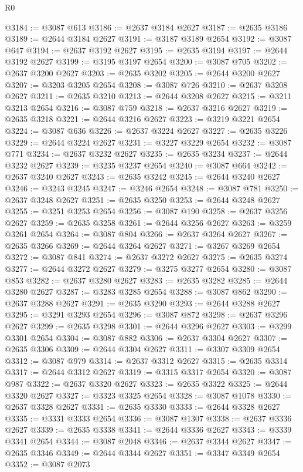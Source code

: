 \begin{lexlean}{R0}
\begin{coremodule}
@3184 := @3087 @613
@3186 := @2637 @3184 @2627
@3187 := @2635 @3186
@3189 := @2644 @3184 @2627
@3191 := @3187 @3189 @2654
@3192 := @3087 @647
@3194 := @2637 @3192 @2627
@3195 := @2635 @3194
@3197 := @2644 @3192 @2627
@3199 := @3195 @3197 @2654
@3200 := @3087 @705
@3202 := @2637 @3200 @2627
@3203 := @2635 @3202
@3205 := @2644 @3200 @2627
@3207 := @3203 @3205 @2654
@3208 := @3087 @726
@3210 := @2637 @3208 @2627
@3211 := @2635 @3210
@3213 := @2644 @3208 @2627
@3215 := @3211 @3213 @2654
@3216 := @3087 @759
@3218 := @2637 @3216 @2627
@3219 := @2635 @3218
@3221 := @2644 @3216 @2627
@3223 := @3219 @3221 @2654
@3224 := @3087 @636
@3226 := @2637 @3224 @2627
@3227 := @2635 @3226
@3229 := @2644 @3224 @2627
@3231 := @3227 @3229 @2654
@3232 := @3087 @771
@3234 := @2637 @3232 @2627
@3235 := @2635 @3234
@3237 := @2644 @3232 @2627
@3239 := @3235 @3237 @2654
@3240 := @3087 @664
@3242 := @2637 @3240 @2627
@3243 := @2635 @3242
@3245 := @2644 @3240 @2627
@3246 := @3243 @3245
@3247 := @3246 @2654
@3248 := @3087 @781
@3250 := @2637 @3248 @2627
@3251 := @2635 @3250
@3253 := @2644 @3248 @2627
@3255 := @3251 @3253 @2654
@3256 := @3087 @190
@3258 := @2637 @3256 @2627
@3259 := @2635 @3258
@3261 := @2644 @3256 @2627
@3263 := @3259 @3261 @2654
@3264 := @3087 @804
@3266 := @2637 @3264 @2627
@3267 := @2635 @3266
@3269 := @2644 @3264 @2627
@3271 := @3267 @3269 @2654
@3272 := @3087 @841
@3274 := @2637 @3272 @2627
@3275 := @2635 @3274
@3277 := @2644 @3272 @2627
@3279 := @3275 @3277 @2654
@3280 := @3087 @853
@3282 := @2637 @3280 @2627
@3283 := @2635 @3282
@3285 := @2644 @3280 @2627
@3287 := @3283 @3285 @2654
@3288 := @3087 @862
@3290 := @2637 @3288 @2627
@3291 := @2635 @3290
@3293 := @2644 @3288 @2627
@3295 := @3291 @3293 @2654
@3296 := @3087 @872
@3298 := @2637 @3296 @2627
@3299 := @2635 @3298
@3301 := @2644 @3296 @2627
@3303 := @3299 @3301 @2654
@3304 := @3087 @882
@3306 := @2637 @3304 @2627
@3307 := @2635 @3306
@3309 := @2644 @3304 @2627
@3311 := @3307 @3309 @2654
@3312 := @3087 @979
@3314 := @2637 @3312 @2627
@3315 := @2635 @3314
@3317 := @2644 @3312 @2627
@3319 := @3315 @3317 @2654
@3320 := @3087 @987
@3322 := @2637 @3320 @2627
@3323 := @2635 @3322
@3325 := @2644 @3320 @2627
@3327 := @3323 @3325 @2654
@3328 := @3087 @1078
@3330 := @2637 @3328 @2627
@3331 := @2635 @3330
@3333 := @2644 @3328 @2627
@3335 := @3331 @3333 @2654
@3336 := @3087 @1307
@3338 := @2637 @3336 @2627
@3339 := @2635 @3338
@3341 := @2644 @3336 @2627
@3343 := @3339 @3341 @2654
@3344 := @3087 @2048
@3346 := @2637 @3344 @2627
@3347 := @2635 @3346
@3349 := @2644 @3344 @2627
@3351 := @3347 @3349 @2654
@3352 := @3087 @2073

\end{coremodule}
\end{lexlean}
